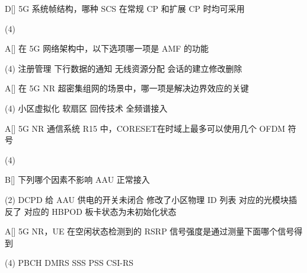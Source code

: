 \begin{choice}{D}[]
    5G 系统帧结构，哪种 SCS 在常规 CP 和扩展 CP 时均可采用
    \begin{tasks}(4)
    \end{tasks}
\end{choice}

\begin{choice}{A}[]
    在 5G 网络架构中，以下选项哪一项是 AMF 的功能
    \begin{tasks}(4)
        \task 注册管理
        \task 下行数据的通知
        \task 无线资源分配
        \task 会话的建立修改删除
    \end{tasks}
\end{choice}


\begin{choice}{A}[]
    在 5G NR 超密集组网的场景中，哪一项是解决边界效应的关键
    \begin{tasks}(4)
        \task 小区虚拟化
        \task 软扇区
        \task 回传技术
        \task 全频谱接入
    \end{tasks}
\end{choice}



\begin{choice}{A}[]
    5G NR 通信系统 R15 中，CORESET在时域上最多可以使用几个 OFDM 符号
    \begin{tasks}(4)
    \end{tasks}
\end{choice}



\begin{choice}{B}[]
    下列哪个因素不影响 AAU 正常接入
    \begin{tasks}(2)
        \task DCPD 给 AAU 供电的开关未闭合
        \task 修改了小区物理 ID 列表
        \task 对应的光模块插反了
        \task 对应的 HBPOD 板卡状态为未初始化状态
    \end{tasks}
\end{choice}




\begin{choice}{A}[]
    5G NR，UE 在空闲状态检测到的 RSRP 信号强度是通过测量下面哪个信号得到
    \begin{tasks}(4)
        \task PBCH DMRS
        \task  SSS
        \task PSS
        \task CSI-RS
    \end{tasks}
\end{choice}

